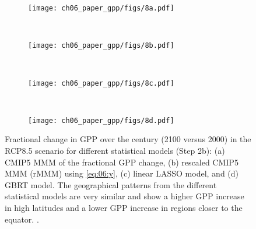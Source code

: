\begin{figure}[t]
  \centering
  \begin{subfigure}[b]{\SubfigureWidth{}}
    \texttt{[image: ch06\_paper\_gpp/figs/8a.pdf]}
    \caption{}
    \label{fig:06:step2b_results:a}
  \end{subfigure}
  ~
  \begin{subfigure}[b]{\SubfigureWidth{}}
    \texttt{[image: ch06\_paper\_gpp/figs/8b.pdf]}
    \caption{}
    \label{fig:06:step2b_results:b}
  \end{subfigure}
  \\
  \begin{subfigure}[b]{\SubfigureWidth{}}
    \texttt{[image: ch06\_paper\_gpp/figs/8c.pdf]}
    \caption{}
    \label{fig:06:step2b_results:c}
  \end{subfigure}
  ~
  \begin{subfigure}[b]{\SubfigureWidth{}}
    \texttt{[image: ch06\_paper\_gpp/figs/8d.pdf]}
    \caption{}
    \label{fig:06:step2b_results:d}
  \end{subfigure}
  \caption[
    Illustration of our \acl{ML} approach to constrain the fractional change in
    \acf{GPP} over the  century with observations in Step 2b.
  ]{
    Fractional change in \acf{GPP} over the  century (2100 versus 2000)
    in the \acs{RCP}8.5 scenario for different statistical models (Step 2b):
    (a) \acs{CMIP}5 \acf{MMM} of the fractional \acs{GPP} change, (b) rescaled
    \acs{CMIP}5 \acl{MMM} (r\acs{MMM}) using \cref{eq:06:y}, (c) linear
    \acf{LASSO} model, and (d) \acf{GBRT} model. The geographical patterns from
    the different statistical models are very similar and show a higher
    \acs{GPP} increase in high latitudes and a lower \acs{GPP} increase in
    regions closer to the equator. .
  }
  \label{fig:06:step2b_results}
\end{figure}


